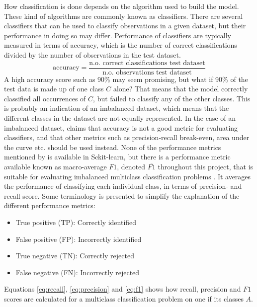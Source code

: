 	
	How classification is done depends on the algorithm used to build the model. These kind of algorithms are commonly known as classifiers. There are several classifiers that can be used to classify observations in a given dataset, but their performance in doing so may differ. Performance of classifiers are typically measured in terms of accuracy, which is the number of correct classifications divided by the number of observations in the test dataset.
\begin{equation}
	\mbox{accuracy} = \frac{\mbox{n.o. correct classifications test dataset}}{\mbox{n.o. observations test dataset}}
\end{equation}
	A high accuracy score such as 90\% may seem promising, but what if 90\% of the test data is made up of one class $C$ alone? That means that the model correctly classified all occurrences of $C$, but failed to classify any of the other classes. This is probably an indication of an imbalanced dataset, which means that the different classes in the dataset are not equally represented. In the case of an imbalanced dataset, \cite{BOOK:11} claims that accuracy is not a good metric for evaluating classifiers, and that other metrics such as precision-recall break-even, area under the curve etc. should be used instead. None of the performance metrics mentioned by \cite{BOOK:11} is available in Sckit-learn, but there is a performance metric available known as macro-average $F1$, denoted $\overline{F1}$ throughout this project, that is suitable for evaluating imbalanced multiclass classification problems \cite{WEBSITE:25}. It averages the performance of classifying each individual class, in terms of precision- and recall score. Some terminology is presented to simplify the explanation of the different performance metrics: 
	\begin{itemize}
		\item{True positive (TP):} Correctly identified 
		\item{False positive (FP):} Incorrectly identified
		\item{True negative (TN):} Correctly rejected
		\item{False negative (FN):} Incorrectly rejected
	\end{itemize}
Equations \ref{eq:recall}, \ref{eq:precision} and \ref{eq:f1} shows how recall, precision and $F1$ scores are calculated for a multiclass classification problem on one if its classes $A$. 

